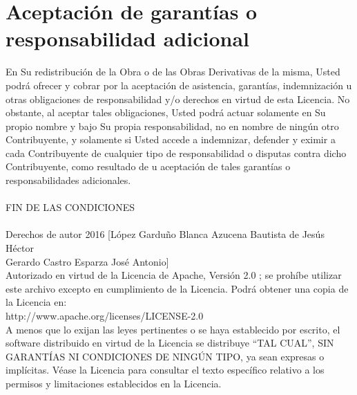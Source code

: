 \section{ Aceptación de garantías o responsabilidad adicional}En Su redistribución de la Obra o de las Obras Derivativas de la misma, Usted podrá ofrecer y cobrar por la aceptación de asistencia, garantías, indemnización u otras obligaciones de responsabilidad y/o derechos en virtud de esta Licencia. No obstante, al aceptar tales obligaciones, Usted podrá actuar solamente en Su propio nombre y bajo Su propia responsabilidad, no en nombre de ningún otro Contribuyente, y solamente si Usted accede a indemnizar, defender y eximir a cada Contribuyente de cualquier tipo de responsabilidad o disputas contra dicho Contribuyente, como resultado de u aceptación de tales garantías o responsabilidades adicionales.\\\\

FIN DE LAS CONDICIONES\\\\

Derechos de autor 2016 [López Garduño Blanca Azucena Bautista de Jesús Héctor \\Gerardo
Castro Esparza José Antonio]\\

Autorizado en virtud de la Licencia de Apache, Versión 2.0 ; se prohíbe utilizar este archivo excepto en cumplimiento de la Licencia.
Podrá obtener una copia de la Licencia en:\\

http://www.apache.org/licenses/LICENSE-2.0\\

A menos que lo exijan las leyes pertinentes o se haya establecido por escrito, el software distribuido en virtud de la Licencia se distribuye “TAL CUAL”, SIN GARANTÍAS NI CONDICIONES DE NINGÚN TIPO, ya sean expresas o implícitas.
Véase la Licencia para consultar el texto específico relativo a los permisos y limitaciones establecidos en la Licencia.

